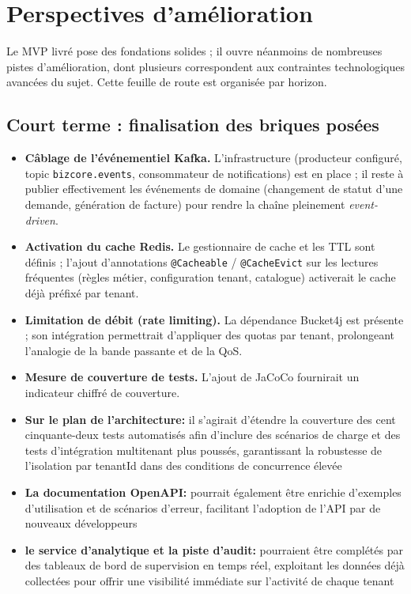 \chapter{Perspectives d'amélioration}
\label{chap:perspectives}

Le MVP livré pose des fondations solides ; il ouvre néanmoins de nombreuses pistes
d'amélioration, dont plusieurs correspondent aux contraintes technologiques avancées du
sujet. Cette feuille de route est organisée par horizon.

\section{Court terme : finalisation des briques posées}

\begin{itemize}
  \item \textbf{Câblage de l'événementiel Kafka.} L'infrastructure (producteur configuré,
        topic \texttt{bizcore.events}, consommateur de notifications) est en place ; il
        reste à publier effectivement les événements de domaine (changement de statut d'une
        demande, génération de facture) pour rendre la chaîne pleinement \emph{event-driven}.
  \item \textbf{Activation du cache Redis.} Le gestionnaire de cache et les TTL sont
        définis ; l'ajout d'annotations \texttt{@Cacheable} / \texttt{@CacheEvict} sur les
        lectures fréquentes (règles métier, configuration tenant, catalogue) activerait le
        cache déjà préfixé par tenant.
  \item \textbf{Limitation de débit (rate limiting).} La dépendance Bucket4j est présente ;
        son intégration permettrait d'appliquer des quotas par tenant, prolongeant l'analogie
        de la bande passante et de la QoS.
  \item \textbf{Mesure de couverture de tests.} L'ajout de JaCoCo fournirait un indicateur
        chiffré de couverture.
    \item\textbf{Sur le plan de l'architecture: }il s'agirait d'étendre la couverture des cent cinquante-deux tests automatisés afin d'inclure des scénarios de charge et des tests d'intégration multitenant plus poussés, garantissant la robustesse de l'isolation par tenantId dans des conditions de concurrence élevée
    
    \item\textbf{La documentation OpenAPI: }pourrait également être enrichie d'exemples d'utilisation et de scénarios d'erreur, facilitant l'adoption de l'API par de nouveaux développeurs

    \item\textbf{le service d'analytique et la piste d'audit:} pourraient être complétés par des tableaux de bord de supervision en temps réel, exploitant les données déjà collectées pour offrir une visibilité immédiate sur l'activité de chaque tenant
    
\end{itemize}

